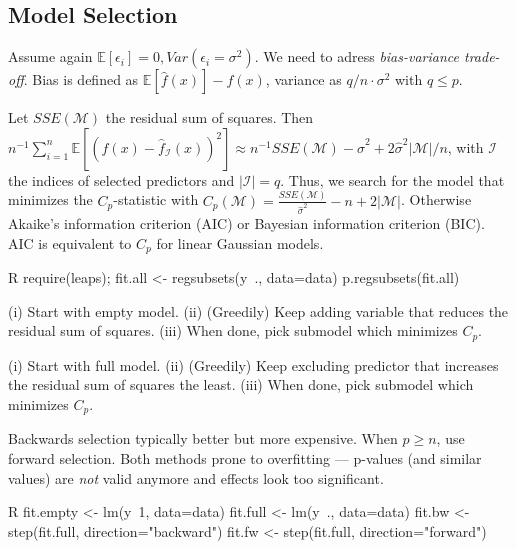 \subsection{Model Selection}\label{subsec:model_selection}
\begin{sectionbox}\nospacing{}
  Assume again $\mathbb{E}[\epsilon_{i}] = 0, Var(\epsilon_{i} = \sigma^{2})$.
  We need to adress \emph{bias-variance trade-off}.
  Bias is defined as $\mathbb{E} [\hat f(x)] - f(x)$, variance as $q/n \cdot \sigma^{2}$ with $q \leq p$.
\end{sectionbox}
\begin{sectionbox}\nospacing{}
  Let $SSE(\mathcal{M})$ the residual sum of squares.
  Then $n^{-1} \sum_{i=1}^{n} \mathbb{E}\left[{(f(x) - \hat f_{\mathcal{I}}(x))}^{2}\right] \approx n^{-1}SSE(\mathcal{M})-\hat \sigma^{2} + 2\hat\sigma^{2}|\mathcal{M}|/n$, with $\mathcal{I}$ the indices of selected predictors and $|\mathcal{I}| = q$.
  Thus, we search for the model that minimizes the $C_{p}$-statistic with $C_{p}(\mathcal{M}) = \frac{SSE(\mathcal{M})}{\hat \sigma^{2}} - n + 2|\mathcal{M}|$.
  Otherwise Akaike's information criterion (AIC) or Bayesian information criterion (BIC). AIC is equivalent to $C_{p}$ for linear Gaussian models.
  \begin{mintlinebox}{R}
    require(leaps); fit.all <- regsubsets(y~., data=data)
    p.regsubsets(fit.all)
  \end{mintlinebox}
\end{sectionbox}
\begin{sectionbox}\nospacing{}
  \begin{description}[topsep=0pt,itemsep=-1ex,partopsep=1ex,parsep=1ex]
    \item[Forward selection] (i) Start with empty model. (ii) (Greedily) Keep adding variable that reduces the residual sum of squares. (iii) When done, pick submodel which minimizes $C_{p}$.
    \item[Backward selection] (i) Start with full model. (ii) (Greedily) Keep excluding predictor that increases the residual sum of squares the least. (iii) When done, pick submodel which minimizes $C_{p}$.
  \end{description}
  Backwards selection typically better but more expensive. When $p \geq n$, use forward selection.
  Both methods prone to overfitting --- p-values (and similar values) are \emph{not} valid anymore and effects look too significant.
  \begin{mintlinebox}{R}
    fit.empty <- lm(y~1, data=data)
    fit.full <- lm(y~., data=data)
    fit.bw <- step(fit.full, direction="backward")
    fit.fw <- step(fit.full, direction="forward")
  \end{mintlinebox}

\end{sectionbox}

